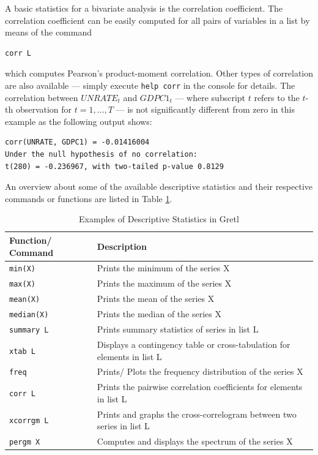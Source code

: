 \documentclass[11pt]{article}
\begin{document}
A basic statistics for a bivariate analysis is the correlation coefficient. The correlation coefficient can be easily computed for all pairs of variables in a list by means of the command
\begin{Verbatim}[baselinestretch=0.75, fontsize=\small]
corr L
\end{Verbatim}
which computes Pearson's product-moment correlation. Other types of correlation %
are also available --- simply execute \texttt{help corr} in the console for details. The correlation between $UNRATE_t$ and $GDPC1_t$ --- where subscript $ t $ refers to the $ t $-th observation for $ t=1,\ldots, T $ --- is not significantly different from zero in this example as the following output shows:
\begin{Verbatim}[baselinestretch=0.75, fontsize=\small]
corr(UNRATE, GDPC1) = -0.01416004
Under the null hypothesis of no correlation:
t(280) = -0.236967, with two-tailed p-value 0.8129
\end{Verbatim}

An overview about some of the available descriptive statistics and their respective commands or functions %
are listed in Table \ref{tab:descriptive}.

\begin{table}[!h]
	\centering
	\caption{Examples of Descriptive Statistics in Gretl}
	\footnotesize
	\begin{tabular}{ll}
		\hline
		Function/ Command & Description \\ 
		\hline 
		\texttt{min(X)} & Prints the minimum of the series X\\
		\texttt{max(X)} & Prints the maximum of the series X\\
		\texttt{mean(X)} & Prints the mean of the series X\\
		\texttt{median(X)} & Prints the median of the series X \\
		\texttt{summary L} & Prints summary statistics of series in list L\\
		\texttt{xtab L} & Displays a contingency table or cross-tabulation for elements in list L\\ 
		\texttt{freq} & Prints/ Plots the frequency distribution of the series X\\
		\texttt{corr L} & Prints the pairwise correlation coefficients for elements in list L\\
		\texttt{xcorrgm L} & Prints and graphs the cross-correlogram between two series in list L\\
		\texttt{pergm X} & Computes and displays the spectrum of the series X\\
		\hline 
	\end{tabular}	
	\label{tab:descriptive}
\end{table}
\end{document}
